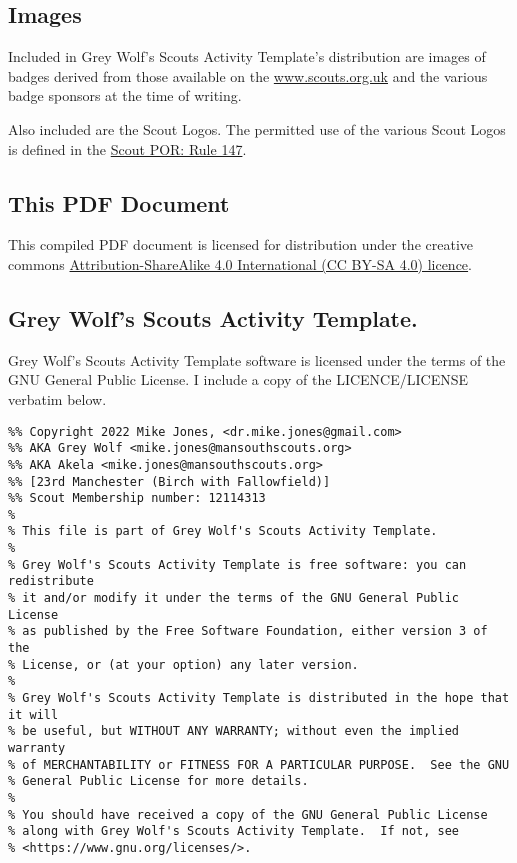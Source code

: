 \documentclass[a4paper]{GreyWolfsScoutActivityTemplate}
\begin{document}
\subsection*{Images}
Included in Grey Wolf's Scouts Activity Template's distribution are images of badges derived from those available on the \href{https://www.scouts.org.uk}{www.scouts.org.uk} and the various badge sponsors at the time of writing.

Also included are the Scout Logos. The permitted use of the various Scout Logos is defined in the \href{https://www.scouts.org.uk/por/14-other-matters/rule-147-protected-scout-logos-names-badges-and-awards/}{Scout POR: Rule 147}.

\subsection*{This PDF Document}
This compiled PDF document is licensed for distribution under the creative commons \href{https://creativecommons.org/licenses/by-sa/4.0/}{Attribution-ShareAlike 4.0 International (CC BY-SA 4.0) licence}.

\subsection*{Grey Wolf's Scouts Activity Template.}
Grey Wolf's Scouts Activity Template software is licensed under the terms of the GNU General Public License. I include a copy of the LICENCE/LICENSE verbatim below.  

\begin{verbatim}
%% Copyright 2022 Mike Jones, <dr.mike.jones@gmail.com>
%% AKA Grey Wolf <mike.jones@mansouthscouts.org>
%% AKA Akela <mike.jones@mansouthscouts.org>
%% [23rd Manchester (Birch with Fallowfield)]
%% Scout Membership number: 12114313
%
% This file is part of Grey Wolf's Scouts Activity Template.
%
% Grey Wolf's Scouts Activity Template is free software: you can redistribute
% it and/or modify it under the terms of the GNU General Public License 
% as published by the Free Software Foundation, either version 3 of the
% License, or (at your option) any later version.
%
% Grey Wolf's Scouts Activity Template is distributed in the hope that it will
% be useful, but WITHOUT ANY WARRANTY; without even the implied warranty
% of MERCHANTABILITY or FITNESS FOR A PARTICULAR PURPOSE.  See the GNU
% General Public License for more details.
%
% You should have received a copy of the GNU General Public License
% along with Grey Wolf's Scouts Activity Template.  If not, see 
% <https://www.gnu.org/licenses/>.
\end{verbatim}
\end{document}
